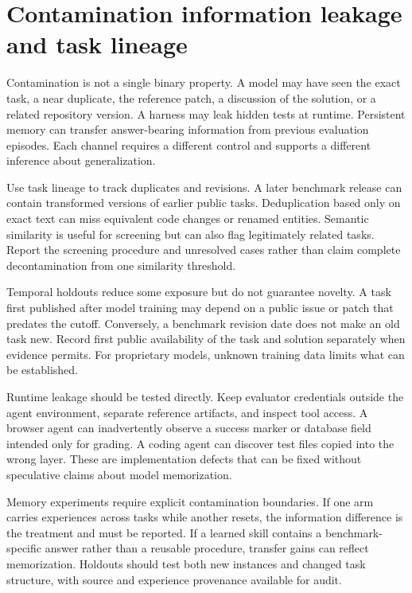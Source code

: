 \section{Contamination information leakage and task lineage}\label{sec:C26:contamination}
Contamination is not a single binary property. A model may have seen the exact task, a near duplicate, the reference patch, a discussion of the solution, or a related repository version. A harness may leak hidden tests at runtime. Persistent memory can transfer answer-bearing information from previous evaluation episodes. Each channel requires a different control and supports a different inference about generalization.

Use task lineage to track duplicates and revisions. A later benchmark release can contain transformed versions of earlier public tasks. Deduplication based only on exact text can miss equivalent code changes or renamed entities. Semantic similarity is useful for screening but can also flag legitimately related tasks. Report the screening procedure and unresolved cases rather than claim complete decontamination from one similarity threshold.

Temporal holdouts reduce some exposure but do not guarantee novelty. A task first published after model training may depend on a public issue or patch that predates the cutoff. Conversely, a benchmark revision date does not make an old task new. Record first public availability of the task and solution separately when evidence permits. For proprietary models, unknown training data limits what can be established.

Runtime leakage should be tested directly. Keep evaluator credentials outside the agent environment, separate reference artifacts, and inspect tool access. A browser agent can inadvertently observe a success marker or database field intended only for grading. A coding agent can discover test files copied into the wrong layer. These are implementation defects that can be fixed without speculative claims about model memorization.

Memory experiments require explicit contamination boundaries. If one arm carries experiences across tasks while another resets, the information difference is the treatment and must be reported. If a learned skill contains a benchmark-specific answer rather than a reusable procedure, transfer gains can reflect memorization. Holdouts should test both new instances and changed task structure, with source and experience provenance available for audit.

